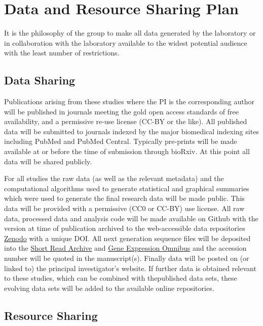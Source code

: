 \section{Data and Resource Sharing
Plan}\label{data-and-resource-sharing-plan}

It is the philosophy of the group to make all data generated by the
laboratory or in collaboration with the laboratory available to the
widest potential audience with the least number of restrictions.

\subsection{Data Sharing}\label{data-sharing}

Publications arising from these studies where the PI is the
corresponding author will be published in journals meeting the gold open
access standards of free availability, and a permissive re-use license
(CC-BY or the like). All published data will be submitted to journals
indexed by the major biomedical indexing sites including PubMed and
PubMed Central. Typically pre-prints will be made available at or before
the time of submission through bioRxiv. At this point all data will be
shared publicly.

For all studies the raw data (as well as the relevant metadata) and the
computational algorithms used to generate statistical and graphical
summaries which were used to generate the final research data will be
made public. This data will be provided with a permissive (CC0 or CC-BY)
use license. All raw data, processed data and analysis code will be made
available on Github with the version at time of publication archived to
the web-accessible data repositories \href{http://zenodo.com}{Zenodo}
with a unique DOI. All next generation sequence files will be deposited
into the \href{https://www.ncbi.nlm.nih.gov/sra}{Short Read Archive} and
\href{http://http://www.ncbi.nlm.nih.gov/geo/\%7D}{Gene Expression
Omnibus} and the accession number will be quoted in the manuscript(s).
Finally data will be posted on (or linked to) the principal
investigator's website. If further data is obtained relevant to these
studies, which can be combined with thepublished data sets, these
evolving data sets will be added to the available online repositories.

\subsection{Resource Sharing}\label{resource-sharing}

